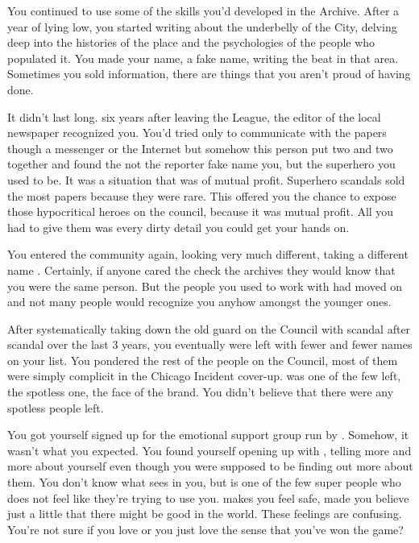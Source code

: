 \documentclass[char]{LRSguildcamp1}
\begin{document}
You continued to use some of the skills you'd developed in the Archive. After a year of lying low, you started writing about the underbelly of the City, delving deep into the histories of the place and the psychologies of the people who populated it. You made your name, a fake name, writing the beat in that area. Sometimes you sold information, there are things that you aren't proud of having done. 

It didn't last long. six years after leaving the League, the editor of the local newspaper recognized you. You'd tried only to communicate with the papers though a messenger or the Internet but somehow this person put two and two together and found the not the reporter fake name you, but the superhero you used to be. It was a situation that was of mutual profit. Superhero scandals sold the most papers because they were rare. This offered you the chance to expose those hypocritical heroes on the council, because it was mutual profit. All you had to give them was every dirty detail you could get your hands on. 

You entered the community again, looking very much different, taking a different name \cYS{\MYsupername}. Certainly, if anyone cared the check the archives they would know that you were the same person. But the people you used to work with had moved on and not many people would recognize you anyhow amongst the younger ones.  

After systematically taking down the old guard on the Council with scandal after scandal over the last 3 years, you eventually were left with fewer and fewer names on your list. You pondered the rest of the people on the Council, most of them were simply complicit in the Chicago Incident cover-up. \cYoungest{} was one of the few left, the spotless one, the face of the brand. You didn't believe that there were any spotless people left. 
 
You got yourself signed up for the emotional support group run by \cYoungest{}. Somehow, it wasn't what you expected. You found yourself opening up with \cYoungest{}, telling \cYoungest{} more and more about yourself even though you were supposed to be finding out more about them. You don't know what \cYoungest{} sees in you, but \cYoungest{} is one of the few super people who does not feel like they're trying to use you. \cYoungest{} makes you feel safe, made you believe just a little that there might be good in the world. These feelings are confusing. You're not sure if you love \cYoungest{} or you just love the sense that you've won the game?
\end{document}
